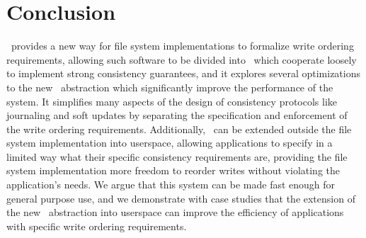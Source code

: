 \section{Conclusion}
\label{sec:conclusion}

\Kudos\ provides a new way for file system implementations to formalize write
ordering requirements, allowing such software to be divided into \modules\
which cooperate loosely to implement strong consistency guarantees, and it
explores several optimizations to the new \chdesc\ abstraction which
significantly improve the performance of the system.  It simplifies many
aspects of the design of consistency protocols like journaling and soft updates
by separating the specification and enforcement of the write ordering
requirements. Additionally, \chdescs\ can be extended outside the file system
implementation into userspace, allowing applications to specify in a limited
way what their specific consistency requirements are, providing the file system
implementation more freedom to reorder writes without violating the
application's needs. We argue that this system can be made fast enough for
general purpose use, and we demonstrate with case studies that the extension of
the new \Kudos\ abstraction into userspace can improve the efficiency of
applications with specific write ordering requirements.
